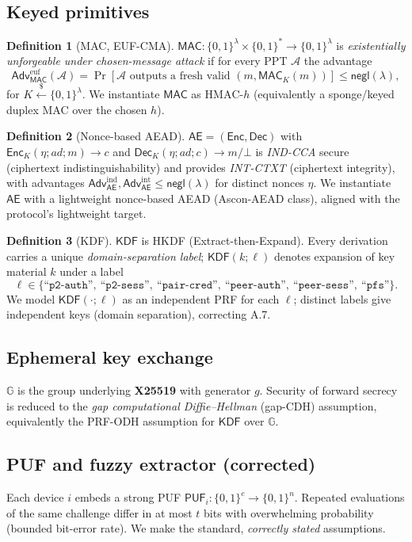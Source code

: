\documentclass[11pt]{article}
\theoremstyle{plain}
\theoremstyle{definition}
\newtheorem{definition}{Definition}
\newcommand{\PUF}{\mathsf{PUF}}
\newcommand{\MAC}{\mathsf{MAC}}
\newcommand{\aead}{\mathsf{AE}}
\newcommand{\Enc}{\mathsf{Enc}}
\newcommand{\Dec}{\mathsf{Dec}}
\newcommand{\KDF}{\mathsf{KDF}}
\newcommand{\adv}{\mathcal{A}}
\newcommand{\secpar}{\lambda}
\newcommand{\bits}{\{0,1\}}
\newcommand{\getsr}{\xleftarrow{\$}}
\newcommand{\negl}{\mathsf{negl}}
\newcommand{\Adv}{\mathsf{Adv}}
\newcommand{\lbl}[1]{\text{``}\texttt{#1}\text{''}}
\begin{document}
\subsection{Keyed primitives}
\begin{definition}[MAC, EUF-CMA]
$\MAC:\bits^\secpar\times\bits^\ast\to\bits^\secpar$ is
\emph{existentially unforgeable under chosen-message attack} if for every
PPT $\adv$ the advantage
\[
\Adv^{\mathrm{euf}}_{\MAC}(\adv)=\Pr\!\left[\adv\text{ outputs a fresh valid }
(m,\MAC_K(m))\right]\le\negl(\secpar),
\]
for $K\getsr\bits^\secpar$.
We instantiate $\MAC$ as $\mathrm{HMAC}$-$h$ (equivalently a sponge/keyed
duplex MAC over the chosen $h$).
\end{definition}

\begin{definition}[Nonce-based AEAD]
$\aead=(\Enc,\Dec)$ with
$\Enc_K(\eta;\mathit{ad};m)\to c$ and $\Dec_K(\eta;\mathit{ad};c)\to
m/\bot$ is \emph{IND-CCA} secure (ciphertext indistinguishability) and
provides \emph{INT-CTXT} (ciphertext integrity), with advantages
$\Adv^{\mathrm{ind}}_{\aead},\Adv^{\mathrm{int}}_{\aead}\le\negl(\secpar)$ for
distinct nonces $\eta$. We instantiate $\aead$ with a lightweight nonce-based
AEAD (Ascon-AEAD class), aligned with the protocol's lightweight target.
\end{definition}

\begin{definition}[KDF]
$\KDF$ is HKDF (Extract-then-Expand). Every derivation carries a unique
\emph{domain-separation label}; $\KDF(k;\ell)$ denotes expansion of key
material $k$ under a label
\[
\ell\in\{\lbl{p2-auth},\ \lbl{p2-sess},\ \lbl{pair-cred},\
  \lbl{peer-auth},\ \lbl{peer-sess},\ \lbl{pfs}\}.
\]
We model
$\KDF(\cdot;\ell)$ as an independent PRF for each $\ell$; distinct labels
give independent keys (domain separation), correcting A.7.
\end{definition}

\subsection{Ephemeral key exchange}
$\mathbb{G}$ is the group underlying \textbf{X25519} with generator $g$.
Security of forward secrecy is reduced to the \emph{gap computational
Diffie--Hellman} (gap-CDH) assumption, equivalently the PRF-ODH assumption
for $\KDF$ over $\mathbb{G}$.

\subsection{PUF and fuzzy extractor (corrected)}
Each device $i$ embeds a strong PUF
$\PUF_i:\bits^{c}\to\bits^{n}$. Repeated evaluations of the same challenge
differ in at most $t$ bits with overwhelming probability (bounded bit-error
rate). We make the standard, \emph{correctly stated} assumptions.
\end{document}
